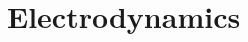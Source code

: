\documentclass[../book.tex]{subfiles}
\begin{document}
\chapter{Electrodynamics}
\label{ch:electrodynamics}




















\chapterbib
\end{document}

